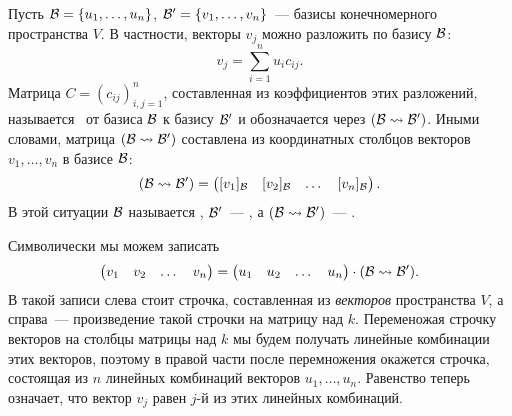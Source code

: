 \begin{definition}\label{def:change_of_basis_matrix}
Пусть $\mathcal B=\{u_1,\dots,u_n\}$, $\mathcal B'=\{v_1,\dots,v_n\}$~--- базисы
конечномерного пространства $V$. В частности, векторы $v_j$ можно
разложить по базису $\mathcal B$:
$$
v_j=\sum_{i=1}^n u_ic_{ij}.
$$
Матрица $C=(c_{ij})_{i,j=1}^n$, составленная из коэффициентов этих
разложений, называется~
от базиса $\mathcal B$ к
базису $\mathcal B'$ и обозначается через $(\mathcal B\rightsquigarrow\mathcal B')$. Иными
словами, матрица $(\mathcal B\rightsquigarrow\mathcal B')$ составлена из координатных
столбцов векторов $v_1,\dots,v_n$ в базисе $\mathcal B$:
$$
(\mathcal B\rightsquigarrow\mathcal B')=\begin{pmatrix}[v_1]_{\mathcal B} & [v_2]_{\mathcal B} & \dots
  & [v_n]_{\mathcal B}\end{pmatrix}.
$$
В этой ситуации $\mathcal B$ называется , $\mathcal B'$~---
, а $(\mathcal B\rightsquigarrow\mathcal B')$~--- .
\end{definition}

Символически мы можем записать
$$
\begin{pmatrix}v_1 & v_2 & \dots & v_n\end{pmatrix} =
\begin{pmatrix}u_1 & u_2 & \dots & u_n\end{pmatrix}\cdot
(\mathcal B\rightsquigarrow\mathcal B').
$$
В такой записи слева стоит строчка, составленная из {\em векторов}
пространства $V$, а справа~--- произведение такой строчки на матрицу
над $k$. Переменожая строчку векторов на столбцы матрицы над $k$ мы
будем получать линейные комбинации этих векторов, поэтому в правой
части после перемножения окажется строчка, состоящая из $n$
линейных комбинаций векторов $u_1,\dots,u_n$. Равенство теперь означает,
что вектор $v_j$ равен $j$-й из этих линейных комбинаций.


